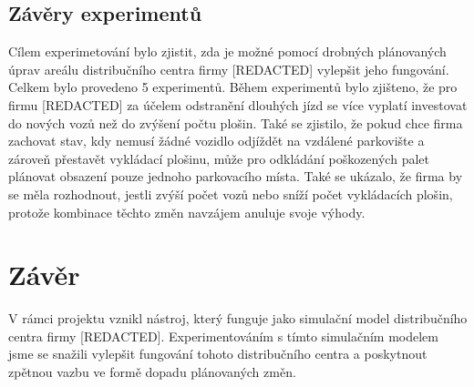 \documentclass[a4paper, 11pt]{article}
\begin{document}
\subsection{Závěry experimentů}
Cílem experimetování bylo zjistit, zda je možné pomocí drobných plánovaných  úprav areálu distribučního centra firmy [REDACTED] vylepšit jeho fungování. Celkem bylo provedeno 5 experimentů. Během experimentů bylo zjišteno, že pro firmu [REDACTED] za účelem odstranění dlouhých jízd se více vyplatí investovat do nových vozů než do zvýšení počtu plošin. Také se zjistilo, že pokud chce firma zachovat stav, kdy nemusí žádné vozidlo odjíždět na vzdálené parkovište a zároveň přestavět vykládací plošinu, může pro odkládání poškozených palet plánovat obsazení pouze jednoho parkovacího místa. Také se ukázalo, že firma by se měla rozhodnout, jestli zvýší počet vozů nebo sníží počet vykládacích plošin, protože kombinace těchto změn navzájem anuluje svoje výhody.

\section{Závěr}
V rámci projektu vznikl nástroj, který funguje jako simulační model distribučního centra firmy [REDACTED]. Experimentováním s tímto simulačním modelem jsme se snažili vylepšit fungování tohoto distribučního centra a poskytnout zpětnou vazbu ve formě dopadu plánovaných změn.
\newpage

\renewcommand{\refname}{Použité zdroje}

\end{document}
